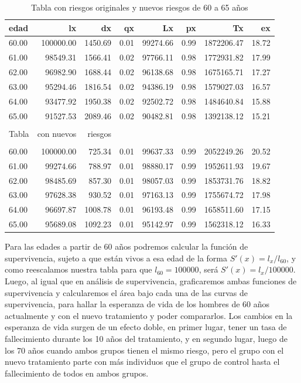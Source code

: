 \documentclass[12pt]{article}
\begin{document}
\begin{table}[ht]
\centering
\begin{tabular}{lrrrrrrr}
  \hline
 edad & lx & dx & qx & Lx & px & Tx & ex \\ 
  \hline
 60.00 & 100000.00 & 1450.69 & 0.01 & 99274.66 & 0.99 & 1872206.47 & 18.72 \\ 
 61.00 & 98549.31 & 1566.41 & 0.02 & 97766.11 & 0.98 & 1772931.82 & 17.99 \\ 
 62.00 & 96982.90 & 1688.44 & 0.02 & 96138.68 & 0.98 & 1675165.71 & 17.27 \\ 
 63.00 & 95294.46 & 1816.54 & 0.02 & 94386.19 & 0.98 & 1579027.03 & 16.57 \\ 
 64.00 & 93477.92 & 1950.38 & 0.02 & 92502.72 & 0.98 & 1484640.84 & 15.88 \\ 
 65.00 & 91527.53 & 2089.46 & 0.02 & 90482.81 & 0.98 & 1392138.12 & 15.21 \\
  \hline \\
      Tabla & con nuevos & riesgos\\
  \hline \\
 60.00 & 100000.00 & 725.34 & 0.01 & 99637.33 & 0.99 & 2052249.26 & 20.52 \\ 
 61.00 & 99274.66 & 788.97 & 0.01 & 98880.17 & 0.99 & 1952611.93 & 19.67 \\ 
 62.00 & 98485.69 & 857.30 & 0.01 & 98057.03 & 0.99 & 1853731.76 & 18.82 \\ 
 63.00 & 97628.38 & 930.52 & 0.01 & 97163.13 & 0.99 & 1755674.72 & 17.98 \\ 
 64.00 & 96697.87 & 1008.78 & 0.01 & 96193.48 & 0.99 & 1658511.60 & 17.15 \\ 
 65.00 & 95689.08 & 1092.23 & 0.01 & 95142.97 & 0.99 & 1562318.12 & 16.33 \\ 
   \hline
\end{tabular}
\caption{Tabla con riesgos originales y nuevos riesgos de 60 a 65 años}
\label{tabla:7}
\end{table}


Para las edades a partir de 60 años podremos calcular la función de supervivencia, sujeto a que están vivos a esa edad de la forma $S'(x)=l_x/l_{60}$, y como reescalamos nuestra tabla para que $l_{60}=100000$, será $S'(x)=l_x/100000$. Luego, al igual que en análisis de supervivencia, graficaremos ambas funciones de supervivencia y calcularemos el área bajo cada una de las curvas de supervivencia, para hallar la esperanza de vida de los hombres de 60 años actualmente y con el nuevo tratamiento y poder compararlos. Los cambios en la esperanza de vida surgen de un efecto doble, en primer lugar, tener un tasa de fallecimiento durante los 10 años del tratamiento, y en segundo lugar, luego de los 70 años cuando ambos grupos tienen el mismo riesgo, pero el grupo con el nuevo tratamiento parte con más individuos que el grupo de control hasta el fallecimiento de todos en ambos grupos.\
\end{document}
